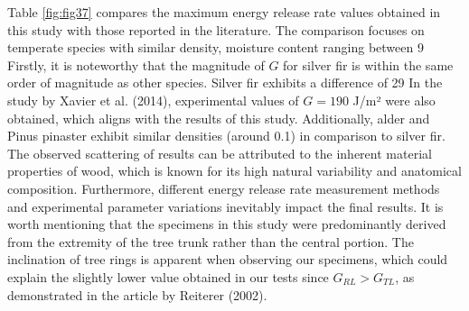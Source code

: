 Table \ref{fig:fig37} compares the maximum energy release rate values obtained in this study with those reported in the literature. The comparison focuses on temperate species with similar density, moisture content ranging between 9%
Firstly, it is noteworthy that the magnitude of $G$ for silver fir is within the same order of magnitude as other species. Silver fir exhibits a difference of 29%
In the study by Xavier et al. (2014), experimental values of $G=190$ J/m² were also obtained, which aligns with the results of this study. Additionally, alder and Pinus pinaster exhibit similar densities (around 0.1) in comparison to silver fir.
The observed scattering of results can be attributed to the inherent material properties of wood, which is known for its high natural variability and anatomical composition. Furthermore, different energy release rate measurement methods and experimental parameter variations inevitably impact the final results.
It is worth mentioning that the specimens in this study were predominantly derived from the extremity of the tree trunk rather than the central portion. The inclination of tree rings is apparent when observing our specimens, which could explain the slightly lower value obtained in our tests since $G_{RL} > G_{TL}$, as demonstrated in the article by Reiterer (2002).

